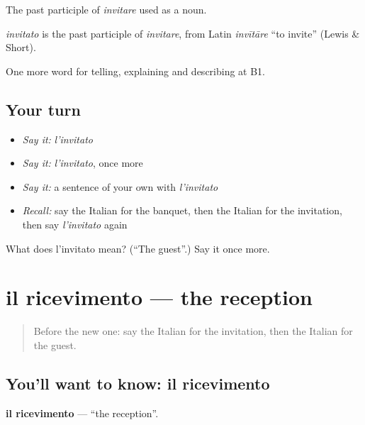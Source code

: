 The past participle of \emph{invitare} used as a noun.

\begin{cousinweb}
\emph{invitato} is the past participle of \emph{invitare}, from Latin \emph{invītāre} \textquotedblleft{}to invite\textquotedblright{} (Lewis \& Short).
\end{cousinweb}

\begin{grammarlens}[title={What you've built}]
One more word for telling, explaining and describing at B1.
\end{grammarlens}

\subsection*{Your turn}
\begin{itemize}
\raggedright
  \item \emph{Say it:} \emph{l'invitato}
  \item \emph{Say it:} \emph{l'invitato}, once more
  \item \emph{Say it:} a sentence of your own with \emph{l'invitato}
  \item \emph{Recall:} say the Italian for the banquet, then the Italian for the invitation, then say \emph{l'invitato} again
\end{itemize}

\begin{tcolorbox}[breakable,colback=teal!4,colframe=teal!35!black,title={Before you move on}]
What does l'invitato mean? (\textquotedblleft{}The guest\textquotedblright{}.) Say it once more.
\end{tcolorbox}
\section[il ricevimento]{il ricevimento — the reception}

\label{lesson:IT-C318-ricevimento}



\begin{quote}
Before the new one: say the Italian for the invitation, then the Italian for the guest.
\end{quote}

\subsection*{You'll want to know: il ricevimento}
\textbf{il ricevimento} — \textquotedblleft{}the reception\textquotedblright{}.

